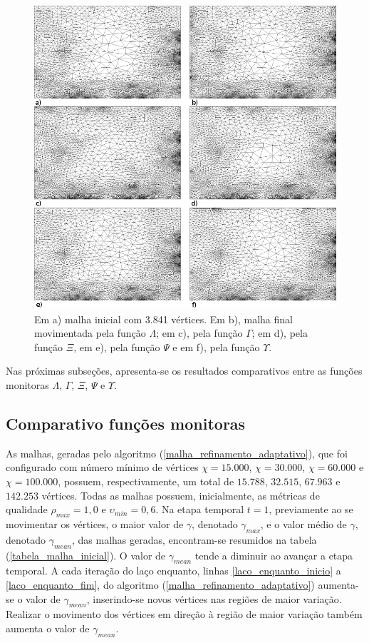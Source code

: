 \begin{figure}[!ht]
  \centering
  \includegraphics[width=400pt]{imagens_resultados/comparacao_movimentos.png}
  \caption{\footnotesize{Em a) malha inicial com 3.841 vértices. Em b), malha final movimentada pela função $\Lambda$; em c), pela função $\Gamma$; em d), pela função $\Xi$, em e), pela função $\Psi$ e em f), pela função $\Upsilon$.
}}
  \label{fig_comparacao_movimentos}
\end{figure}

Nas próximas subseções, apresenta-se os resultados comparativos entre as funções monitoras $\Lambda$, $\Gamma$, $\Xi$, $\Psi$ e $\Upsilon$.

\subsection{Comparativo funções monitoras}
\label{comparativo_a}

As malhas, geradas pelo algoritmo (\ref{malha_refinamento_adaptativo}), que foi configurado com número mínimo de vértices $\chi = 15.000$, $\chi = 30.000$, $\chi = 60.000$ e $\chi = 100.000$, possuem, respectivamente, um total de $15.788$, $32.515$, $67.963$ e $142.253$ vértices. Todas as malhas possuem, inicialmente, as métricas de qualidade $\rho_{max} = 1,0$ e $\upsilon_{min} = 0,6$. Na etapa temporal $t=1$, previamente ao se movimentar os vértices, o maior valor de $\gamma$, denotado $\gamma_{max}$, e o valor médio de $\gamma$, denotado $\gamma_{mean}$, das malhas geradas, encontram-se resumidos na tabela (\ref{tabela_malha_inicial}). O valor de $\gamma_{mean}$ tende a diminuir ao avançar a etapa temporal. A cada iteração do laço enquanto, linhas \ref{laco_enquanto_inicio} a \ref{laco_enquanto_fim}, do algoritmo (\ref{malha_refinamento_adaptativo}) aumenta-se o valor de $\gamma_{mean}$, inserindo-se novos vértices nas regiões de maior variação. Realizar o movimento dos vértices em direção à região de maior variação também aumenta o valor de $\gamma_{mean}$.

